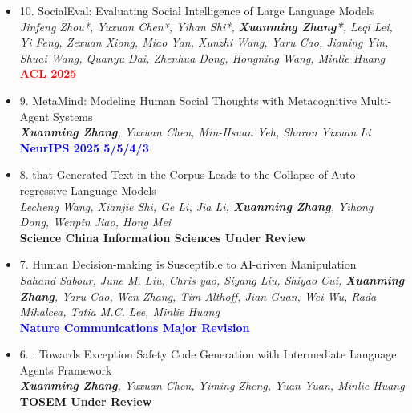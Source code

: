 \documentclass[zh]{resume}
\begin{document}
\begin{itemize}

  \item 10. SocialEval: Evaluating Social Intelligence of Large Language Models\\
  \textit{Jinfeng Zhou*, Yuxuan Chen*, Yihan Shi*, \textbf{Xuanming Zhang*}, Leqi Lei, Yi Feng, Zexuan Xiong, Miao Yan, Xunzhi Wang, Yaru Cao, Jianing Yin, Shuai Wang, Quanyu Dai, Zhenhua Dong, Hongning Wang, Minlie Huang}\\
  \textcolor{red}{\textbf{ACL 2025}} 
  
  \item 9. MetaMind: Modeling Human Social Thoughts with Metacognitive Multi-Agent Systems\\
  \textit{\textbf{Xuanming Zhang}, Yuxuan Chen, Min-Hsuan Yeh, Sharon Yixuan Li}\\
  \textcolor{blue}{\textbf{NeurIPS 2025 5/5/4/3}}  
  
  \item 8.  that Generated Text in the Corpus Leads to the Collapse of Auto-regressive Language Models\\
  \textit{Lecheng Wang, Xianjie Shi, Ge Li, Jia Li, \textbf{Xuanming Zhang}, Yihong Dong, Wenpin Jiao, Hong Mei}\\
  \textbf{Science China Information Sciences Under Review} 
  
  \item 7. Human Decision-making is Susceptible to AI-driven Manipulation\\
  \textit{Sahand Sabour, June M. Liu, Chris yao, Siyang Liu, Shiyao Cui, \textbf{Xuanming Zhang}, Yaru Cao, Wen Zhang, Tim Althoff, Jian Guan, Wei Wu, Rada Mihalcea, Tatia M.C. Lee, Minlie Huang}\\
  \textcolor{blue}{\textbf{Nature Communications Major Revision}} 
  
  \item 6. : Towards Exception Safety Code Generation with Intermediate Language Agents Framework\\
  \textit{\textbf{Xuanming Zhang}, Yuxuan Chen, Yiming Zheng, Yuan Yuan, Minlie Huang}\\
  \textbf{TOSEM Under Review}  
  

\end{itemize}
\end{document}
